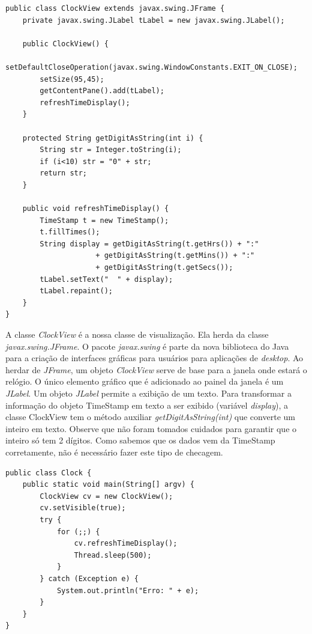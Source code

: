 \documentclass[
	article,			%
	12pt,				%
	openright,
	twoside,			%
	a4paper,			%
	english,			%
	french,
	brazil,				%
	sumario=tradicional
	]{abntex2}
\begin{document}
\begin{verbatim}
public class ClockView extends javax.swing.JFrame {
    private javax.swing.JLabel tLabel = new javax.swing.JLabel();
    
    public ClockView() {
        setDefaultCloseOperation(javax.swing.WindowConstants.EXIT_ON_CLOSE);
        setSize(95,45);
        getContentPane().add(tLabel);
        refreshTimeDisplay();
    }
    
    protected String getDigitAsString(int i) {
        String str = Integer.toString(i);
        if (i<10) str = "0" + str;
        return str;
    }
    
    public void refreshTimeDisplay() {
        TimeStamp t = new TimeStamp();
        t.fillTimes();
        String display = getDigitAsString(t.getHrs()) + ":"
                     + getDigitAsString(t.getMins()) + ":"
                     + getDigitAsString(t.getSecs());
        tLabel.setText("  " + display);
        tLabel.repaint();
    }
}
\end{verbatim}

A classe \emph{ClockView} é a nossa classe de visualização. Ela herda da classe \emph{javax.swing.JFrame}. O pacote \emph{javax.swing} é parte da nova biblioteca do Java para a criação de interfaces gráficas para usuários para aplicações de \textit{desktop}. Ao herdar de \emph{JFrame}, um objeto \emph{ClockView} serve de base para a janela onde estará o relógio. O único elemento gráfico que é adicionado ao painel da janela é um \emph{JLabel}. Um objeto \emph{JLabel} permite a exibição de um texto. Para transformar a informação do objeto TimeStamp em texto a ser exibido (variável \emph{display}), a classe ClockView tem o método auxiliar \emph{getDigitAsString(int)} que converte um inteiro em texto. Observe que não foram tomados cuidados para garantir que o inteiro só tem 2 dígitos. Como sabemos que os dados vem da TimeStamp corretamente, não é necessário fazer este tipo de checagem.

\begin{verbatim}
public class Clock {
    public static void main(String[] argv) {
        ClockView cv = new ClockView();
        cv.setVisible(true);
        try {
            for (;;) {
                cv.refreshTimeDisplay();
                Thread.sleep(500);
            }
        } catch (Exception e) {
            System.out.println("Erro: " + e);
        }
    }
}
\end{verbatim}
\end{document}
